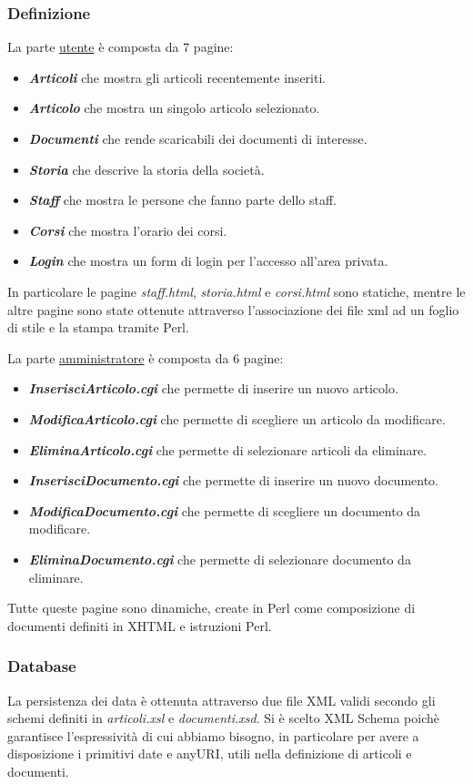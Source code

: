 \subsubsection{Definizione}
	\noindent La parte \underline{utente} \`e composta da 7 pagine:
\begin{itemize}
	\item {\bfseries\textit{Articoli}} che mostra gli articoli recentemente inseriti.
	\item {\bfseries\textit{Articolo}} che mostra un singolo articolo selezionato.
	\item {\bfseries\textit{Documenti}} che rende scaricabili dei documenti di interesse.
	\item {\bfseries\textit{Storia}} che descrive la storia della societ\`a.
	\item {\bfseries\textit{Staff}} che mostra le persone che fanno parte dello staff.
	\item {\bfseries\textit{Corsi}} che mostra l'orario dei corsi.
	\item {\bfseries\textit{Login}} che mostra un form di login per l'accesso all'area privata.
\end{itemize}
	In particolare le pagine \textit{staff.html}, \textit{storia.html} e \textit{corsi.html} sono statiche, mentre le altre pagine sono state ottenute attraverso l'associazione dei file xml ad un foglio di stile e la stampa tramite Perl.

La parte \underline{amministratore} \`e composta da 6 pagine:
\begin{itemize}
	\item {\bfseries\textit{InserisciArticolo.cgi}} che permette di inserire un nuovo articolo.
	\item {\bfseries\textit{ModificaArticolo.cgi}} che permette di scegliere un articolo da modificare.
	\item {\bfseries\textit{EliminaArticolo.cgi}} che permette di selezionare articoli da eliminare.
	\item {\bfseries\textit{InserisciDocumento.cgi}} che permette di inserire un nuovo documento.
	\item {\bfseries\textit{ModificaDocumento.cgi}} che permette di scegliere un documento da modificare.
	\item {\bfseries\textit{EliminaDocumento.cgi}} che permette di selezionare documento da eliminare.
\end{itemize}	
	
	Tutte queste pagine sono dinamiche, create in Perl come composizione di documenti definiti in XHTML e istruzioni Perl.
	
\subsubsection{Database}
	La persistenza dei data \`e ottenuta attraverso due file XML validi secondo gli schemi definiti in \textit{articoli.xsl} e \textit{documenti.xsd}. Si \`e scelto XML Schema poich\`e garantisce l'espressivit\`a di cui abbiamo bisogno, in particolare per avere a disposizione i primitivi date e anyURI, utili nella definizione di articoli e documenti.
